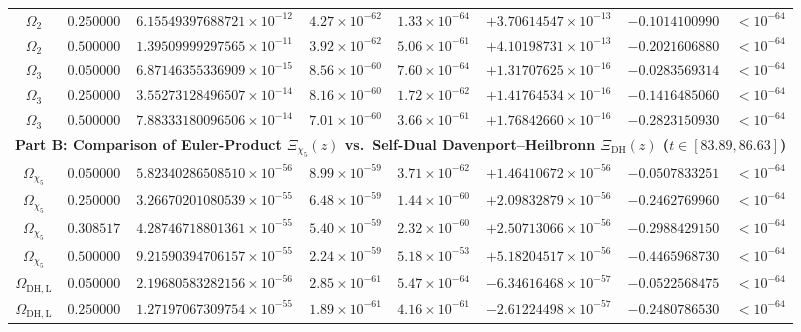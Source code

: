 \documentclass[11pt,reqno]{amsart}
\theoremstyle{definition}
\theoremstyle{remark}
\numberwithin{equation}{section}
\newcommand{\DHf}{\mathrm{DH}}
\begin{document}
\begin{table}[htbp]
\begin{tabular}{@{}cccccccc@{}}
$\Omega_2$ & $0.250000$ & $6.15549397688721 \times 10^{-12}$ & $4.27 \times 10^{-62}$ & $1.33 \times 10^{-64}$ & $+3.70614547 \times 10^{-13}$ & $-0.1014100990$ & $< 10^{-64}$ \\
$\Omega_2$ & $0.500000$ & $1.39509999297565 \times 10^{-11}$ & $3.92 \times 10^{-62}$ & $5.06 \times 10^{-61}$ & $+4.10198731 \times 10^{-13}$ & $-0.2021606880$ & $< 10^{-64}$ \\
$\Omega_3$ & $0.050000$ & $6.87146355336909 \times 10^{-15}$ & $8.56 \times 10^{-60}$ & $7.60 \times 10^{-64}$ & $+1.31707625 \times 10^{-16}$ & $-0.0283569314$ & $< 10^{-64}$ \\
$\Omega_3$ & $0.250000$ & $3.55273128496507 \times 10^{-14}$ & $8.16 \times 10^{-60}$ & $1.72 \times 10^{-62}$ & $+1.41764534 \times 10^{-16}$ & $-0.1416485060$ & $< 10^{-64}$ \\
$\Omega_3$ & $0.500000$ & $7.88333180096506 \times 10^{-14}$ & $7.01 \times 10^{-60}$ & $3.66 \times 10^{-61}$ & $+1.76842660 \times 10^{-16}$ & $-0.2823150930$ & $< 10^{-64}$ \\
\midrule
\multicolumn{8}{c}{\textbf{Part B: Comparison of Euler-Product $\Xi_{\chi_5}(z)$ vs.\ Self-Dual Davenport--Heilbronn $\Xi_{\DHf}(z)$ ($t \in [83.89, 86.63]$)}} \\
\midrule
$\Omega_{\chi_5}$ & $0.050000$ & $5.82340286508510 \times 10^{-56}$ & $8.99 \times 10^{-59}$ & $3.71 \times 10^{-62}$ & $+1.46410672 \times 10^{-56}$ & $-0.0507833251$ & $< 10^{-64}$ \\
$\Omega_{\chi_5}$ & $0.250000$ & $3.26670201080539 \times 10^{-55}$ & $6.48 \times 10^{-59}$ & $1.44 \times 10^{-60}$ & $+2.09832879 \times 10^{-56}$ & $-0.2462769960$ & $< 10^{-64}$ \\
$\Omega_{\chi_5}$ & $0.308517$ & $4.28746718801361 \times 10^{-55}$ & $5.40 \times 10^{-59}$ & $2.32 \times 10^{-60}$ & $+2.50713066 \times 10^{-56}$ & $-0.2988429150$ & $< 10^{-64}$ \\
$\Omega_{\chi_5}$ & $0.500000$ & $9.21590394706157 \times 10^{-55}$ & $2.24 \times 10^{-59}$ & $5.18 \times 10^{-53}$ & $+5.18204517 \times 10^{-56}$ & $-0.4465968730$ & $< 10^{-64}$ \\
$\Omega_{\DHf,\mathrm{L}}$ & $0.050000$ & $2.19680583282156 \times 10^{-56}$ & $2.85 \times 10^{-61}$ & $5.47 \times 10^{-64}$ & $-6.34616468 \times 10^{-57}$ & $-0.0522568475$ & $< 10^{-64}$ \\
$\Omega_{\DHf,\mathrm{L}}$ & $0.250000$ & $1.27197067309754 \times 10^{-55}$ & $1.89 \times 10^{-61}$ & $4.16 \times 10^{-61}$ & $-2.61224498 \times 10^{-57}$ & $-0.2480786530$ & $< 10^{-64}$ \\

\end{tabular}
\end{table}
\end{document}

